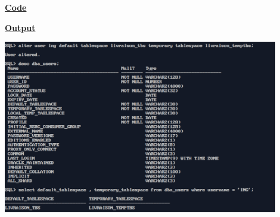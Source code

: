 \newpage
{}

\textbf{\underline{Code}}


\vspace{1cm}
\textbf{\underline{Output}}
\vspace{1cm}
\begin{center}
    \includegraphics[width=0.9\textwidth]{Questions/q43/q43.png}
\end{center}


